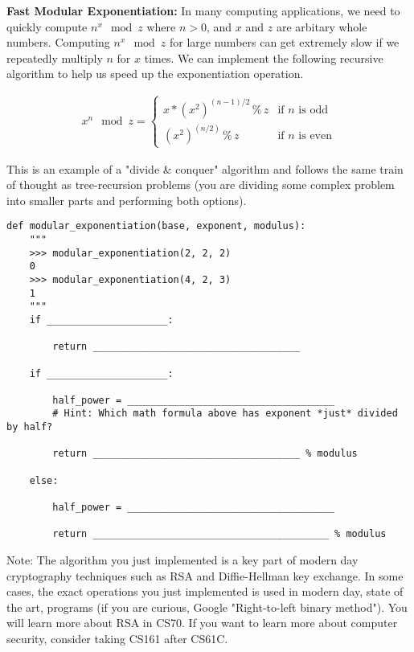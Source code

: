 \begin{blocksection}
    \question \textbf{Fast Modular Exponentiation:} In many computing applications, we need to quickly compute $n^{x} \mod z $ where $n > 0$, and $x$ and $z$ are arbitary whole numbers. Computing $n^{x} \mod z$ for large numbers can get extremely slow if we repeatedly multiply $n$ for $x$ times. We can implement the following recursive algorithm to help us speed up the exponentiation operation.

    \begin{gather*}
        x^{n} \mod z = 
        \begin{cases}
            x * (x^{2})^{(n-1)/2} \, \% \, z & \text{if $n$ is odd}\\
            (x^{2})^{(n/2)} \, \% \, z & \text{if $n$ is even}
        \end{cases}
    \end{gather*}

    This is an example of a "divide \& conquer" algorithm and follows the same train of thought as tree-recursion problems (you are dividing some complex problem into smaller parts and performing both options).
    
    \begin{lstlisting}
def modular_exponentiation(base, exponent, modulus):
    """
    >>> modular_exponentiation(2, 2, 2)
    0
    >>> modular_exponentiation(4, 2, 3)
    1
    """
    if _____________________:

        return ____________________________________

    if _____________________:
            
        half_power = ____________________________________
        # Hint: Which math formula above has exponent *just* divided by half?

        return ____________________________________ % modulus

    else:  

        half_power = ____________________________________

        return _________________________________________ % modulus
    \end{lstlisting}

    Note: The algorithm you just implemented is a key part of modern day cryptography techniques such as RSA and Diffie-Hellman key exchange. In some cases, the exact operations you just implemented is used in modern day, state of the art, programs (if you are curious, Google "Right-to-left binary method"). You will learn more about RSA in CS70. If you want to learn more about computer security, consider taking CS161 after CS61C.
    \end{blocksection}
    
